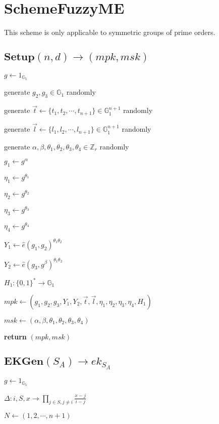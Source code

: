 \documentclass[a4paper]{article}
\begin{document}
\section{SchemeFuzzyME}

This scheme is only applicable to symmetric groups of prime orders. 

\subsection{$\textbf{Setup}(n, d) \rightarrow (\textit{mpk}, \textit{msk})$}

$g \gets 1_{\mathbb{G}_1}$

generate $g_2, g_3 \in \mathbb{G}_1$ randomly

generate $\vec{t} \gets \{t_1, t_2, \cdots, t_{n + 1}\} \in \mathbb{G}_1^{n + 1}$ randomly

generate $\vec{l} \gets \{l_1, l_2, \cdots, l_{n + 1}\} \in \mathbb{G}_1^{n + 1}$ randomly

generate $\alpha, \beta, \theta_1, \theta_2, \theta_3, \theta_4 \in \mathbb{Z}_r$ randomly

$g_1 \gets g^\alpha$

$\eta_1 \gets g^{\theta_1}$

$\eta_2 \gets g^{\theta_2}$

$\eta_3 \gets g^{\theta_3}$

$\eta_4 \gets g^{\theta_4}$

$Y_1 \gets \hat{e}(g_1, g_2)^{\theta_1 \theta_2}$

$Y_2 \gets \hat{e}(g_3, g^\beta)^{\theta_1 \theta_2}$

$H_1: \{0, 1\}^* \rightarrow \mathbb{G}_1$

$ \textit{mpk} \gets (g_1, g_2, g_3, Y_1, Y_2, \vec{t}, \vec{l}, \eta_1, \eta_2, \eta_3, \eta_4, H_1)$

$\textit{msk} \gets (\alpha, \beta, \theta_1, \theta_2, \theta_3, \theta_4)$

\textbf{return} $(\textit{mpk}, \textit{msk})$

\subsection{$\textbf{EKGen}(S_A) \rightarrow \textit{ek}_{S_A}$}

$g \gets 1_{\mathbb{G}_1}$

$\Delta: i, S, x \rightarrow \prod\limits_{j \in S, j \neq i} \frac{x - j}{i - j}$

$N \gets (1, 2, \cdots, n + 1)$
\end{document}

